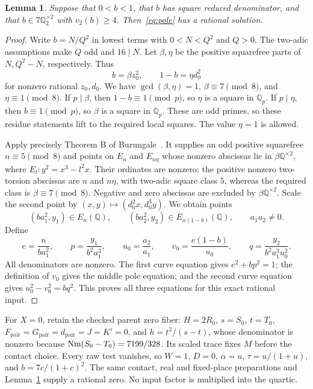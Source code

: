 \documentclass[11pt,a4paper]{article}
\newtheorem{lemma}[theorem]{Lemma}
\newcommand{\Q}{\mathbb Q}\newcommand{\Z}{\mathbb Z}
\begin{document}
\begin{lemma}\label{lem:pole-completeness}
Suppose that $0<b<1$, that $b$ has square reduced denominator, and that
$b\in7\Q_2^{\times2}$ with $v_2(b)\ge4$. Then~\eqref{eq:pole} has a
rational solution.
\end{lemma}
\begin{proof}
Write $b=N/Q^2$ in lowest terms with $0<N<Q^2$ and $Q>0$.
The two-adic assumptions make $Q$ odd and $16\mid N$.
Let $\beta,\eta$ be the positive squarefree parts of $N,Q^2-N$,
respectively. Thus
\[
 b=\beta z_0^2,\qquad 1-b=\eta d_0^2
\]
for nonzero rational $z_0,d_0$. We have $\gcd(\beta,\eta)=1$,
$\beta\equiv7\pmod8$, and $\eta\equiv1\pmod8$.
If $p\mid\beta$, then $1-b\equiv1\pmod p$, so $\eta$ is a square
in $\Q_p$. If $p\mid\eta$, then $b\equiv1\pmod p$, so $\beta$
is a square in $\Q_p$. These are odd primes, so these residue statements
lift to the required local squares. The value $\eta=1$ is allowed.

Apply precisely Theorem B of Burungale~\cite{Burungale}. It supplies
an odd positive squarefree $n\equiv5\pmod8$ and points on
$E_n$ and $E_{n\eta}$ whose nonzero abscissas lie in
$\beta\Q^{\times2}$, where $E_l:y^2=x^3-l^2x$.
Their ordinates are nonzero: the positive nonzero two-torsion abscissas
are $n$ and $n\eta$, with two-adic square class $5$, whereas the
required class is $\beta\equiv7\pmod8$. Negative and zero
abscissas are excluded by $\beta\Q^{\times2}$.
Scale the second point by $(x,y)\mapsto(d_0^2x,d_0^3y)$.
We obtain points
\[
 (ba_1^2,y_1)\in E_n(\Q),\qquad
 (ba_2^2,y_2)\in E_{n(1-b)}(\Q),\qquad a_1a_2\ne0.
\]
Define
\[
 e=\frac{n}{ba_1^2},\qquad p=\frac{y_1}{b^2a_1^3},\qquad
 u_0=\frac{a_2}{a_1},\qquad
 v_0=\frac{e(1-b)}{u_0},\qquad
 q=\frac{y_2}{b^2a_1^3u_0^2}.
\]
All denominators are nonzero. The first curve equation gives
$e^2+bp^2=1$; the definition of $v_0$ gives the middle pole equation;
and the second curve equation gives $u_0^2-v_0^2=bq^2$.
This proves all three equations for this exact rational input.
\end{proof}

For $X=0$, retain the checked parent zero fiber: $H=2R_0$,
$s=S_0$, $t=T_0$, $F_{\mathrm{pair}}=G_{\mathrm{pair}}=d_{
\mathrm{pair}}=J=K'=0$, and
$h=t^2/(s-t)$, whose denominator is nonzero because
$\operatorname{Nm}(S_0-T_0)=7199/328$. Its scaled trace fixes $M$ before the contact
choice. Every raw test vanishes, so $W=1$, $D=0$, $\alpha=u$,
$\tau=u/(1+u)$, and $b=7c/(1+c)^2$. The same contact, real and
fixed-place preparations and Lemma~\ref{lem:pole-completeness} supply
a rational zero. No input factor is
multiplied into the quartic.
\end{document}
